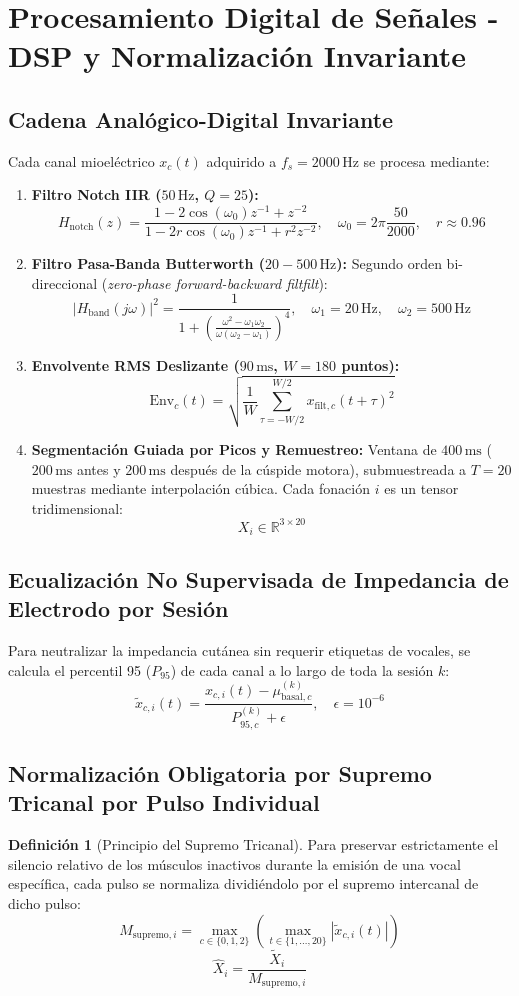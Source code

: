 \documentclass[11pt,a4paper,openany]{book}
\theoremstyle{definition}
\newtheorem{definicion}{Definición}[chapter]
\begin{document}
\section{Procesamiento Digital de Señales - DSP y Normalización Invariante}
\label{sec:dsp_completo}

\subsection{Cadena Analógico-Digital Invariante}
Cada canal mioeléctrico $x_c(t)$ adquirido a $f_s = 2000\,\text{Hz}$ se procesa mediante:
\begin{enumerate}
    \item \textbf{Filtro Notch IIR ($50\,\text{Hz}$, $Q = 25$):}
    $$H_{\text{notch}}(z) = \frac{1 - 2\cos(\omega_0) z^{-1} + z^{-2}}{1 - 2 r \cos(\omega_0) z^{-1} + r^2 z^{-2}}, \quad \omega_0 = 2\pi \frac{50}{2000}, \quad r \approx 0.96$$
    \item \textbf{Filtro Pasa-Banda Butterworth ($20 - 500\,\text{Hz}$):} Segundo orden bi-direccional (\textit{zero-phase forward-backward filtfilt}):
    $$|H_{\text{band}}(j\omega)|^2 = \frac{1}{1 + \left( \frac{\omega^2 - \omega_1 \omega_2}{\omega(\omega_2 - \omega_1)} \right)^4}, \quad \omega_1 = 20\,\text{Hz}, \quad \omega_2 = 500\,\text{Hz}$$
    \item \textbf{Envolvente RMS Deslizante ($90\,\text{ms}$, $W = 180$ puntos):}
    $$\text{Env}_c(t) = \sqrt{\frac{1}{W} \sum_{\tau = -W/2}^{W/2} x_{\text{filt}, c}(t + \tau)^2}$$
    \item \textbf{Segmentación Guiada por Picos y Remuestreo:} Ventana de $400\,\text{ms}$ ($200\,\text{ms}$ antes y $200\,\text{ms}$ después de la cúspide motora), submuestreada a $T = 20$ muestras mediante interpolación cúbica. Cada fonación $i$ es un tensor tridimensional:
    $$X_i \in \mathbb{R}^{3 \times 20}$$
\end{enumerate}

\subsection{Ecualización No Supervisada de Impedancia de Electrodo por Sesión}
Para neutralizar la impedancia cutánea sin requerir etiquetas de vocales, se calcula el percentil 95 ($P_{95}$) de cada canal a lo largo de toda la sesión $k$:
$$\tilde{x}_{c, i}(t) = \frac{x_{c, i}(t) - \mu_{\text{basal}, c}^{(k)}}{P_{95, c}^{(k)} + \epsilon}, \quad \epsilon = 10^{-6}$$

\subsection{Normalización Obligatoria por Supremo Tricanal por Pulso Individual}
\begin{definicion}[Principio del Supremo Tricanal]
Para preservar estrictamente el silencio relativo de los músculos inactivos durante la emisión de una vocal específica, cada pulso se normaliza dividiéndolo por el supremo intercanal de dicho pulso:
$$M_{\text{supremo}, i} = \max_{c \in \{0, 1, 2\}} \left( \max_{t \in \{1,\dots,20\}} |\tilde{x}_{c, i}(t)| \right)$$
$$\hat{X}_i = \frac{\tilde{X}_i}{M_{\text{supremo}, i}}$$
\end{definicion}
\end{document}
